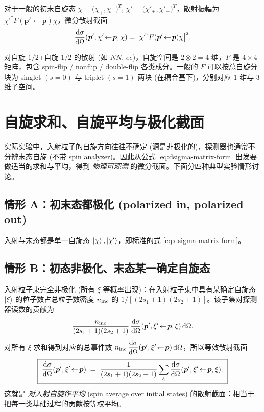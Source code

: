 对于一般的初末自旋态 $\chi=\bigl(\chi_+,\chi_-\bigr)^T$, $\chi'=\bigl(\chi'_+,\chi'_-\bigr)^T$，散射振幅为 $\chi'^\dagger F(\bm p'\!\leftarrow\!\bm p)\chi$，微分散射截面
\begin{equation}
  \frac{\mathrm{d}\sigma}{\mathrm{d}\Omega}(\bm p',\chi'\!\leftarrow\!\bm p,\chi)
  =\bigl|\chi'^\dagger F(\bm p'\!\leftarrow\!\bm p)\chi\bigr|^2.
  \label{eq:dsigma-12-0}
\end{equation}

\begin{remark}
  对自旋 $1/2$+自旋 $1/2$ 的散射 (如 $NN$, $e e$)，自旋空间是 $2\otimes 2=4$ 维，$F$ 是 $4\times 4$ 矩阵，包含 spin-flip / nonflip / double-flip 各类成分。一般的 $F$ 可以按总自旋分块为 singlet $(s=0)$ 与 triplet $(s=1)$ 两块 (在耦合基下)，分别对应 $1$ 维与 $3$ 维子空间。
\end{remark}

\section{自旋求和、自旋平均与极化截面}\label{sec:sum-average}

实际实验中，入射粒子的自旋方向往往不确定 (源是非极化的)，探测器也通常不分辨末态自旋 (不带 spin analyzer)。因此从公式 \eqref{eq:dsigma-matrix-form} 出发要做适当的求和与平均，得到 \emph{物理可观测} 的微分截面。下面分四种典型实验情形讨论。

\subsection{情形 A：初末态都极化 (polarized in, polarized out)}

入射与末态都是单一自旋态 $\ket\chi,\ket{\chi'}$，即标准的式 \eqref{eq:dsigma-matrix-form}。

\subsection{情形 B：初态非极化、末态某一确定自旋态}

入射粒子束完全非极化 (所有 $\xi$ 等概率出现)：在入射粒子束中具有某确定自旋态 $\ket\xi$ 的粒子数占总粒子数密度 $n_{\rm inc}$ 的 $1/[(2s_1+1)(2s_2+1)]$。该子集对探测器读数的贡献为
\begin{equation}
  \frac{n_{\rm inc}}{(2s_1+1)(2s_2+1)}\,\frac{\mathrm{d}\sigma}{\mathrm{d}\Omega}(\bm p',\xi'\!\leftarrow\!\bm p,\xi)\,\mathrm{d}\Omega.
\end{equation}
对所有 $\xi$ 求和得到对应的总事件数 $n_{\rm inc}\,\dfrac{\mathrm{d}\sigma}{\mathrm{d}\Omega}(\bm p',\xi'\!\leftarrow\!\bm p)\,\mathrm{d}\Omega$，所以等效散射截面
\begin{equation}
  \boxed{\;\frac{\mathrm{d}\sigma}{\mathrm{d}\Omega}(\bm p',\xi'\!\leftarrow\!\bm p)
  \;=\;\frac{1}{(2s_1+1)(2s_2+1)}\sum_{\xi}\frac{\mathrm{d}\sigma}{\mathrm{d}\Omega}(\bm p',\xi'\!\leftarrow\!\bm p,\xi).\;}
  \label{eq:dsigma-avg-in}
\end{equation}
这就是 \emph{对入射自旋作平均} (spin average over initial states) 的散射截面：相当于把每一类基础过程的贡献按等权平均。

